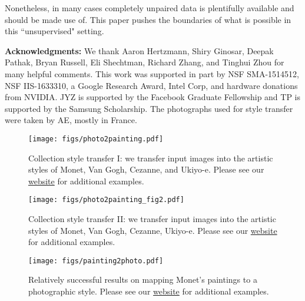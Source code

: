 \documentclass[10pt,twocolumn,letterpaper]{article}
\newcommand{\lblfig}[1]{\label{fig:#1}}
\begin{document}
Nonetheless, in many cases completely unpaired data is plentifully available and should be made use of. This paper pushes the boundaries of what is possible in this ``unsupervised" setting.

{\bf Acknowledgments:} We thank Aaron Hertzmann, Shiry Ginosar, Deepak Pathak, Bryan Russell, Eli Shechtman, Richard Zhang, and Tinghui Zhou for many helpful comments. This work was supported in part by NSF SMA-1514512, NSF IIS-1633310, a Google Research Award, Intel Corp, and hardware donations from NVIDIA. JYZ is supported by the Facebook Graduate Fellowship and TP is supported by the Samsung Scholarship. The photographs used for style transfer were taken by AE, mostly in France.



\begin{figure*}[h]
\begin{center}
\texttt{[image: figs/photo2painting.pdf]}
\end{center}
 \caption{Collection style transfer I: we transfer input images into the artistic styles of Monet, Van Gogh, Cezanne, and Ukiyo-e. Please see our \href{https://junyanz.github.io/CycleGAN/}{website} for additional examples.}
\lblfig{painting}
\end{figure*}

\begin{figure*}[h]
\begin{center}
\texttt{[image: figs/photo2painting\_fig2.pdf]}
\end{center}
 \caption{Collection style transfer II: we transfer input images into the artistic styles of Monet, Van Gogh, Cezanne, Ukiyo-e. Please see our \href{https://junyanz.github.io/CycleGAN/}{website} for additional examples.}
\lblfig{painting2}
\end{figure*}


\begin{figure*}[h]
\begin{center}
\texttt{[image: figs/painting2photo.pdf]}
\end{center}
 \caption{Relatively successful results on mapping Monet's paintings to a photographic style. Please see our \href{https://junyanz.github.io/CycleGAN/}{website} for additional examples.}
\lblfig{painting2photo}
 \vspace{24mm}
\end{figure*}
\end{document}
